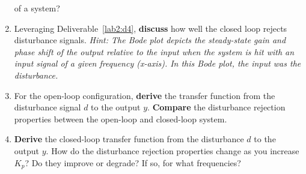 \begin{deliverable}[label={lab2:report}]
\begin{enumerate}[label={(\arabic*)}]
{      of a system?
      \label{lab2:report:q7}
    }
    \item{
      Leveraging Deliverable~\ref{lab2:d4}, \textbf{discuss} how well the
      closed loop rejects disturbance signals. \emph{Hint: The Bode plot
      depicts the steady-state gain and phase shift of the output relative
      to the input when the system is hit with an input signal of a given
      frequency (x-axis). In this Bode plot, the input was the disturbance.}
      \label{lab2:report:q8}
    }
    \item{
      For the open-loop configuration, \textbf{derive} the transfer function
      from the disturbance signal \(d\) to the output \(y.\)
      \textbf{Compare} the disturbance rejection properties between the
      open-loop and closed-loop system.
      \label{lab2:report:q9}
    }
    \item{
      \textbf{Derive} the closed-loop transfer function from the
      disturbance \(d\) to the output \(y.\) How do the disturbance rejection
      properties change as you increase \(K_p\)? Do they improve or degrade?
      If so, for what frequencies?
      \label{lab2:report:q10}
    }
  \end{enumerate}
\end{deliverable}

